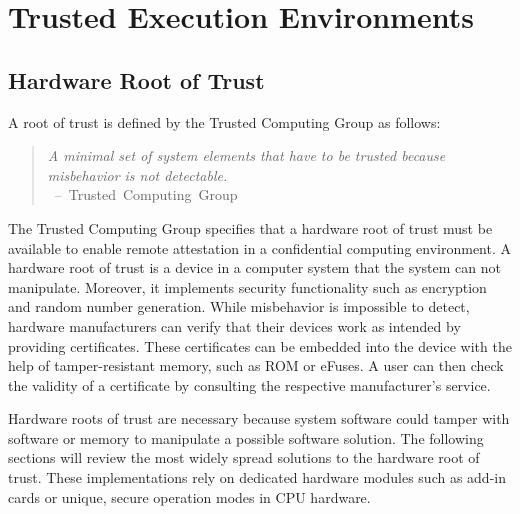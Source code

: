 \section{Trusted Execution Environments}
\label{sec:20:tee}


\subsection{Hardware Root of Trust}
\label{sec:20:hardware_root_of_trust}
A root of trust is defined by the Trusted Computing Group as follows:
\begin{quote}
    \textit{
        A minimal set of system elements that have to be trusted because misbehavior is not detectable. \\
    }
    \mbox{ -- Trusted Computing Group\cite{tpm_architecture}}
\end{quote}

The Trusted Computing Group specifies that a
hardware root of trust must be available to enable remote attestation in a confidential computing environment.\cite{tpm_architecture}
A hardware root of trust is a device in a computer system that the system can not manipulate. Moreover, it
implements security functionality such as encryption and random number generation. While misbehavior is impossible
to detect, hardware manufacturers can verify that their devices work as intended by providing certificates. These
certificates can be embedded into the device with the help of tamper-resistant memory, such as ROM or eFuses. A user can
then check the validity of a certificate by consulting the respective manufacturer's service.

Hardware roots of trust are necessary because system software could tamper with software or memory to manipulate a
possible software solution. The following sections will review the most widely spread solutions to the hardware root
of trust. These implementations rely on dedicated hardware modules such as add-in cards or unique, secure operation
modes in CPU hardware.


